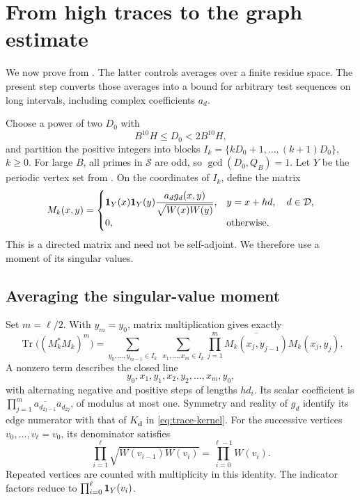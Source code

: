 \section{From high traces to the graph estimate}\label{sec:localization}

We now prove  from .
The latter controls averages over a finite residue space. The present
step converts those averages into a bound for arbitrary test sequences
on long intervals, including complex coefficients $a_d$.

Choose a power of two $D_0$ with
\[
 B^{10}H\le D_0<2B^{10}H,
\]
and partition the positive integers into blocks
$I_k=\{kD_0+1,\ldots,(k+1)D_0\}$, $k\ge0$.
For large $B$, all primes in $\mathcal S$ are odd, so
$\gcd(D_0,Q_B)=1$. Let $Y$ be the periodic vertex set from
. On the coordinates of $I_k$, define the matrix
\[
 M_k(x,y)=
 \begin{cases}
 \displaystyle\mathbf 1_Y(x)\mathbf 1_Y(y)
 \frac{a_dg_d(x,y)}{\sqrt{W(x)W(y)}},
       &y=x+hd,\quad d\in\mathcal D,\\[5pt]
 0,&\text{otherwise}.
 \end{cases}
\]
This is a directed matrix and need not be self-adjoint. We therefore
use a moment of its singular values.

\subsection{Averaging the singular-value moment}

Set $m=\ell/2$. With $y_m=y_0$, matrix multiplication gives exactly
\begin{equation}\label{eq:localization-trace}
 \operatorname{Tr}\bigl((M_k^*M_k)^m\bigr)
 =\sum_{y_0,\ldots,y_{m-1}\in I_k}\ 
   \sum_{x_1,\ldots,x_m\in I_k}
   \prod_{j=1}^m\overline{M_k(x_j,y_{j-1})}M_k(x_j,y_j).
\end{equation}
A nonzero term describes the closed line
\[
 y_0,x_1,y_1,x_2,y_2,\ldots,x_m,y_0,
\]
with alternating negative and positive steps of lengths $hd_i$.
Its scalar coefficient is
$\prod_{j=1}^m\overline{a_{d_{2j-1}}}a_{d_{2j}}$, of modulus at most one.
Symmetry and reality of $g_d$ identify its edge numerator with that of
$K_{\mathbf d}$ in \eqref{eq:trace-kernel}. For the successive vertices
$v_0,\ldots,v_\ell=v_0$, its denominator satisfies
\[
 \prod_{i=1}^{\ell}\sqrt{W(v_{i-1})W(v_i)}
       =\prod_{i=0}^{\ell-1}W(v_i).
\]
Repeated vertices are counted with multiplicity in this identity.
The indicator factors reduce to $\prod_{i=0}^\ell\mathbf 1_Y(v_i)$.

